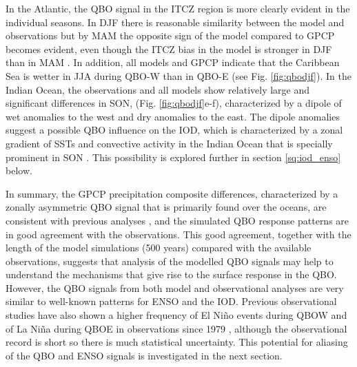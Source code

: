 In the Atlantic, the QBO signal in the ITCZ region is more clearly evident in the individual seasons. In DJF there is reasonable similarity between the model and observations but by MAM the opposite sign of the model compared to GPCP becomes evident, even though the ITCZ bias in the model is stronger in DJF than in MAM \citep{garciafranco2020}. In addition, all models and GPCP indicate that the Caribbean Sea is wetter in JJA during QBO-W than in QBO-E (see Fig. \ref{fig:qbodjf}). In the Indian Ocean, the observations and all models show relatively large and significant differences in SON, (Fig. \ref{fig:qbodjf}e-f), characterized by a dipole of wet anomalies to the west and dry anomalies to the east. The dipole anomalies suggest a possible QBO influence on the IOD, which is characterized by a zonal gradient of SSTs and convective activity in the Indian Ocean that is specially prominent in SON \citep{saji1999iod,deser2010sea,mckenna2020iod}. This possibility is explored further in section \ref{sq:iod_enso} below.  

In summary, the GPCP precipitation composite differences, characterized by a zonally asymmetric QBO signal that is primarily found over the oceans, are consistent with previous analyses \citep{liess2012,gray2018}, and the simulated QBO response patterns are in good agreement with the observations. This good agreement, together with the length of the model simulations (500 years) compared with the available observations, suggests that analysis of the modelled QBO signals may help to understand the mechanisms that give rise to the surface response in the QBO. However, the QBO signals from both model and observational analyses are very similar to well-known patterns for ENSO and the IOD. Previous observational studies have also shown a higher frequency of El Niño events during QBOW and of La Niña during QBOE in observations since 1979 \citep{taguchi2010,liess2012}, although the observational record is short so there is much statistical uncertainty. This potential for aliasing of the QBO and ENSO signals is investigated in the next section.

